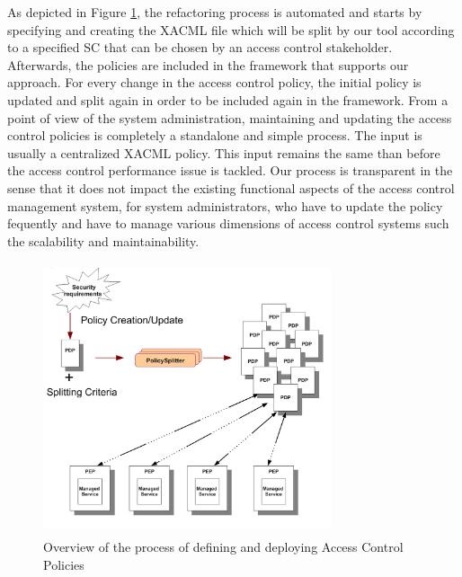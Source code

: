 As depicted in Figure \ref{overallprocess}, the refactoring process is automated and starts by specifying and creating the XACML file which 
will be split by our tool according to a specified SC that can be chosen by an access control stakeholder. Afterwards, the policies are included in the 
framework that supports our approach. For every change in the access control policy, the initial policy is updated and 
split again in order to be included again in the framework.
From a point of view of the system administration, maintaining and updating the access control policies is completely a standalone and simple
 process. The input is usually a centralized XACML policy. This input remains the same than before the access control performance issue is tackled.
Our process is transparent in the sense that it does not impact the existing functional aspects of the access control management system, 
for system administrators, who have to update the policy fequently and have to manage various dimensions of access control 
systems such the scalability and maintainability.
\begin{figure}[!h]
\begin{center}
\includegraphics[width=8.5cm, height=8cm]{Overall-process}
\caption{Overview of the process of defining and deploying Access Control Policies}
\label{overallprocess}
\end{center}
\end{figure} 